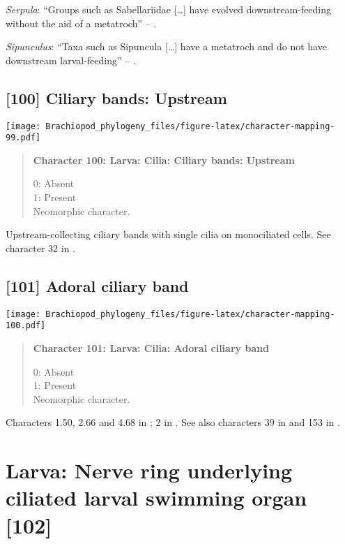 \documentclass[openany]{book}
\theoremstyle{definition}
\theoremstyle{definition}
\theoremstyle{definition}
\theoremstyle{remark}
\begin{document}
\hypertarget{Serpula-coding-99}{}
\emph{Serpula}: ``Groups such as Sabellariidae {[}\ldots{}{]} have
evolved downstream-feeding without the aid of a metatroch'' --
\citep{Rouse2000}.

\hypertarget{Sipunculus-coding-99}{}
\emph{Sipunculus}: ``Taxa such as Sipuncula {[}\ldots{}{]} have a
metatroch and do not have downstream larval-feeding'' --
\citet{Rouse2000}.

\subsection*{{[}100{]} Ciliary bands:
Upstream}\label{ciliary-bands-upstream}

\texttt{[image: Brachiopod\_phylogeny\_files/figure-latex/character-mapping-99.pdf]}

\begin{quote}
\textbf{Character 100: Larva: Cilia: Ciliary bands: Upstream}

0: Absent\\
1: Present\\
Neomorphic character.
\end{quote}

Upstream-collecting ciliary bands with single cilia on monociliated
cells. See character 32 in \citet{Glenner2004}.

\subsection*{{[}101{]} Adoral ciliary band}\label{adoral-ciliary-band}

\texttt{[image: Brachiopod\_phylogeny\_files/figure-latex/character-mapping-100.pdf]}

\begin{quote}
\textbf{Character 101: Larva: Cilia: Adoral ciliary band}

0: Absent\\
1: Present\\
Neomorphic character.
\end{quote}

Characters 1.50, 2.66 and 4.68 in \citet{SPS1996}; 2 in
\citet{Vinther2008}. See also characters 39 in \citet{Haszprunar1996}
and 153 in \citet{Giribet2002}.

\section{Larva: Nerve ring underlying ciliated larval swimming organ
{[}102{]}}\label{larva-nerve-ring-underlying-ciliated-larval-swimming-organ-102}
\end{document}
